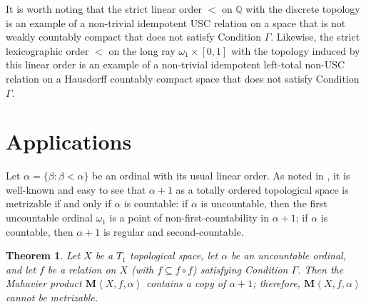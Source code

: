 \documentclass{article}
\newcommand{\tuple}[1]{\left\langle{#1}\right\rangle}
\newcommand{\maProd}[1]{{\mathbf{M}}\tuple{#1}}
\theoremstyle{plain}
\newtheorem{theorem}{Theorem}
\theoremstyle{definition}
\theoremstyle{remark}
\begin{document}
It is worth noting that the strict linear order \(<\) on \(\mathbb Q\) 
with the discrete topology is an example of a non-trivial idempotent
USC relation on a space that is not weakly countably compact
that does not satisfy Condition \(\Gamma\). Likewise,
the strict lexicographic order \(<\) on the long ray
\(\omega_1\times[0,1]\) with the topology induced by this linear order 
is an example of a non-trivial idempotent
left-total non-USC relation on a Hausdorff countably compact 
space that does not satisfy Condition \(\Gamma\).

\section{Applications}

Let \(\alpha=\{\beta:\beta<\alpha\}\) be an ordinal with its usual 
linear order. As noted in \cite{CLONTZVARAGONA}, it is well-known and 
easy to see that \(\alpha+1\) as a totally ordered topological space
is metrizable if and only if \(\alpha\) is countable: if 
\(\alpha\) is uncountable, then the first uncountable ordinal
\(\omega_1\) is
a point of non-first-countability in \(\alpha+1\); if \(\alpha\)
is countable, then \(\alpha+1\) is regular and second-countable.

\begin{theorem}
  Let \(X\) be a \(T_1\) topological space, let
  \(\alpha\) be an uncountable ordinal, and let \(f\) be a relation on $X$ (with $f \subseteq f \circ f$)
  satisfying Condition \(\Gamma\). 
  Then the Mahavier product 
  \(\maProd{X,f,\alpha}\) contains a copy of \(\alpha+1\); 
  therefore, \(\maProd{X,f,\alpha}\) cannot be metrizable.
\end{theorem}
\end{document}
